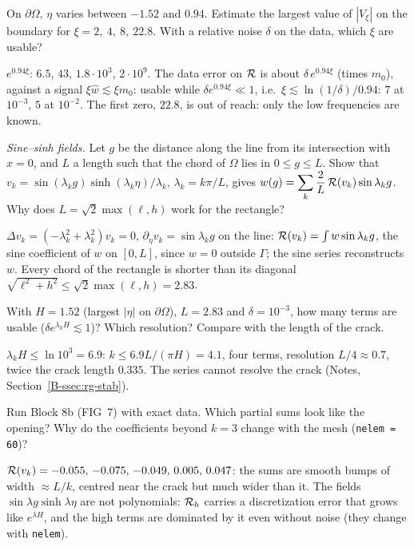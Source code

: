\q On $\partial\Omega$, $\eta$ varies between $-1.52$ and $0.94$. Estimate the
largest value of $|V_\xi|$ on the boundary for $\xi=2,\ 4,\ 8,\ 22.8$. With a
relative noise $\delta$ on the data, which $\xi$ are usable?
\begin{answer}
$e^{0.94\xi}$: $6.5$, $43$, $1.8\cdot10^3$, $2\cdot10^9$. The data error on
$\mathcal{R}$ is about $\delta\,e^{0.94\xi}$ (times $m_0$), against a signal
$\xi\hat w\lesssim\xi m_0$: usable while $\delta e^{0.94\xi}\ll1$, i.e.\
$\xi\lesssim\ln(1/\delta)/0.94$: $7$ at $10^{-3}$, $5$ at $10^{-2}$. The
first zero, $22.8$, is out of reach: only the low frequencies are known.
\end{answer}

\q \emph{Sine--sinh fields.} Let $g$ be the distance along the line from its
intersection with $x=0$, and $L$ a length such that the chord of $\Omega$
lies in $0\le g\le L$. Show that $v_k=\sin(\lambda_kg)\sinh(\lambda_k\eta)/
\lambda_k$, $\lambda_k=k\pi/L$, gives
$\displaystyle w(g)=\sum_k\frac2L\,\mathcal{R}(v_k)\sin\lambda_kg$. Why does
$L=\sqrt2\max(\ell,h)$ work for the rectangle?
\begin{answer}
$\Delta v_k=(-\lambda_k^2+\lambda_k^2)v_k=0$, $\partial_\eta v_k=\sin\lambda_kg$
on the line: $\mathcal{R}(v_k)=\int w\sin\lambda_kg$, the sine coefficient of $w$ on
$[0,L]$, since $w=0$ outside $\Gamma$; the sine series reconstructs $w$.
Every chord of the rectangle is shorter than its diagonal
$\sqrt{\ell^2+h^2}\le\sqrt2\max(\ell,h)=2.83$.
\end{answer}

\q With $H=1.52$ (largest $|\eta|$ on $\partial\Omega$), $L=2.83$ and
$\delta=10^{-3}$, how many terms are usable ($\delta e^{\lambda_kH}\lesssim1$)?
Which resolution? Compare with the length of the crack.
\begin{answer}
$\lambda_kH\le\ln10^3=6.9$: $k\le6.9L/(\pi H)=4.1$, four terms, resolution
$L/4\approx0.7$, twice the crack length $0.335$. The series cannot resolve
the crack (Notes, Section~\ref{B-ssec:rg-stab}).
\end{answer}

\qc Run Block 8b (FIG~7) with exact data. Which partial sums look like the
opening? Why do the coefficients beyond $k=3$ change with the mesh
(\texttt{nelem = 60})?
\begin{answer}
$\mathcal{R}(v_k)=-0.055,\,-0.075,\,-0.049,\,0.005,\,0.047$: the sums are smooth bumps
of width $\approx L/k$, centred near the crack but much wider than it. The
fields $\sin\lambda g\sinh\lambda\eta$ are not polynomials: $\mathcal{R}_h$ carries a
discretization error that grows like $e^{\lambda H}$, and the high terms are
dominated by it even without noise (they change with \texttt{nelem}).
\end{answer}

